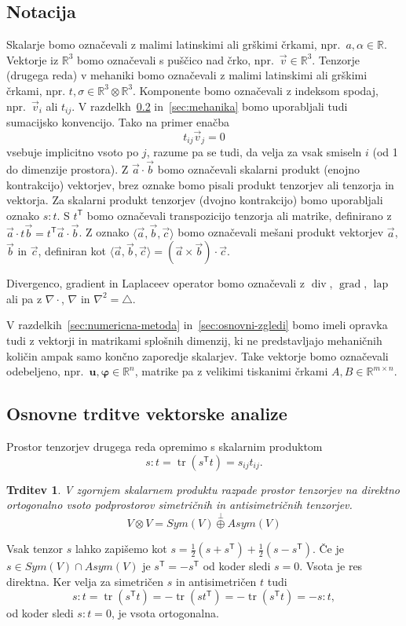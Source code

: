 \documentclass[12pt,a4paper]{article}
\theoremstyle{definition} %
\theoremstyle{plain} %
\newtheorem{trditev}[definicija]{Trditev}
\numberwithin{equation}{section}
\newcommand{\R}{\mathbb R}
\newcommand{\T}{\mathsf{T}}
\newcommand{\lap}{\operatorname{lap}}
\renewcommand{\div}{\operatorname{div}}
\newcommand{\grad}{\operatorname{grad}}
\renewcommand{\b}{\boldsymbol}
\renewcommand{\phi}{\varphi}
\newcommand{\vv}{\vec{v}}
\newcommand{\va}{\vec{a}}
\newcommand{\vc}{\vec{c}}
\newcommand{\vb}{\vec{b}}
\DeclareMathOperator{\tr}{tr}
\begin{document}
\subsection{Notacija}
Skalarje bomo označevali z malimi latinskimi ali grškimi črkami, npr.\ $a, \alpha
\in \R$. Vektorje iz $\R^3$ bomo označevali s puščico nad črko, npr.\ $\vv \in
\R^3$. Tenzorje (drugega reda) v mehaniki bomo označevali z malimi latinskimi ali grškimi
črkami, npr. $t, \sigma \in \R^3\otimes\R^3$.
Komponente bomo označevali z indeksom spodaj, npr.\ $\vv_{i}$ ali $t_{ij}$.
V razdelkh~\ref{sec:uvod-tenz} in~\ref{sec:mehanika} bomo
uporabljali tudi sumacijsko konvencijo. Tako na primer enačba
\[
  t_{ij}\vv_j = 0
\]
vsebuje implicitno vsoto po $j$, razume pa se tudi, da velja za vsak smiseln $i$
(od 1 do dimenzije prostora). Z $\va\cdot\vb$ bomo označevali skalarni produkt
(enojno kontrakcijo) vektorjev, brez oznake bomo pisali produkt tenzorjev ali
tenzorja in vektorja. Za skalarni produkt tenzorjev (dvojno kontrakcijo) bomo
uporabljali oznako $s:t$.  S $t^\T$ bomo označevali transpozicijo tenzorja ali
matrike, definirano z $\va\cdot t\vb = t^\T\va \cdot \vb$. Z oznako $\langle
\va, \vb, \vc\rangle$ bomo označevali mešani produkt vektorjev $\va$, $\vb$ in
$\vc$, definiran kot $\langle \va, \vb, \vc\rangle = (\va\times\vb)\cdot \vc$.

Divergenco, gradient in Laplaceev operator bomo označevali z $\div$, $\grad$,
$\lap$ ali pa z $\nabla\cdot$, $\nabla$ in $\nabla^2 = \triangle$.

V razdelkih~\ref{sec:numericna-metoda} in~\ref{sec:osnovni-zgledi} bomo imeli
opravka tudi z vektorji in matrikami splošnih dimenzij, ki ne predstavljajo
mehaničnih količin ampak samo končno zaporedje skalarjev. Take vektorje bomo
označevali odebeljeno, npr.\ $\b u, \b\phi \in \R^{n}$, matrike pa z velikimi
tiskanimi črkami $A, B \in \R^{m\times n}$.

\subsection{Osnovne trditve vektorske analize}
\label{sec:uvod-tenz}

Prostor tenzorjev drugega reda opremimo s skalarnim produktom\[
s:t = \tr(s^\T t) = s_{ij}t_{ij}.\]
\begin{trditev}
  \label{trd:dot-antisym-tensor}
  V zgornjem skalarnem produktu razpade prostor tenzorjev na direktno
  ortogonalno vsoto podprostorov simetričnih in antisimetričnih tenzorjev.
  \[V\otimes V = Sym(V) \overset{\perp}{\oplus} Asym(V) \]
\end{trditev}
\proof
  Vsak tenzor $s$ lahko zapišemo kot $s = \frac12 (s+s^\T) + \frac12(s-s^\T)$.
  Če je $s \in Sym(V)\cap Asym(V)$ je $s^\T = -s^\T$ od koder sledi $s = 0$.
  Vsota je res direktna. Ker velja za simetričen $s$ in antisimetričen $t$ tudi
  \[ s:t = \tr(s^\T t) =  -\tr(s t^\T) = -\tr(s^\T t) = -s:t,\]
  od koder sledi $s:t = 0$, je vsota ortogonalna.
\endproof
\end{document}
